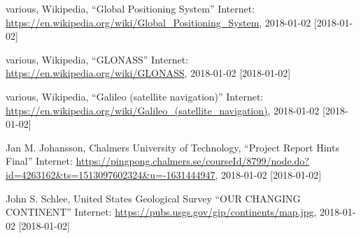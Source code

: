 \documentclass[12pt,a4paper]{article}
\begin{document}
\newpage
\begin{thebibliography}{1}

 various, Wikipedia,  ``Global Positioning System'' Internet: \url{https://en.wikipedia.org/wiki/Global_Positioning_System}, 2018-01-02 [2018-01-02]

 various, Wikipedia,  ``GLONASS'' Internet: \url{https://en.wikipedia.org/wiki/GLONASS}, 2018-01-02 [2018-01-02]

 various, Wikipedia,  ``Galileo (satellite navigation)'' Internet: \url{https://en.wikipedia.org/wiki/Galileo_(satellite_navigation)}, 2018-01-02 [2018-01-02]

 Jan M. Johansson, Chalmers University of Technology,  ``Project Report Hints Final'' Internet: \url{https://pingpong.chalmers.se/courseId/8799/node.do?id=4263162&ts=1513097602324&u=-1631444947}, 2018-01-02 [2018-01-02]

 John S. Schlee, United States Geological Survey ``OUR CHANGING CONTINENT'' Internet: \url{https://pubs.usgs.gov/gip/continents/map.jpg}, 2018-01-02 [2018-01-02]


\end{thebibliography}
\end{document}
